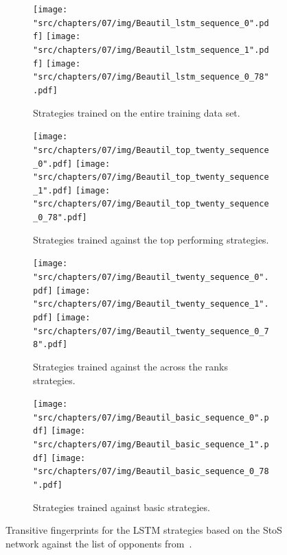 \begin{figure}[!htbp]
    \begin{subfigure}{\textwidth}
        \texttt{[image: "src/chapters/07/img/Beautil\_lstm\_sequence\_0".pdf]}
        \texttt{[image: "src/chapters/07/img/Beautil\_lstm\_sequence\_1".pdf]}
        \texttt{[image: "src/chapters/07/img/Beautil\_lstm\_sequence\_0\_78".pdf]}
        \caption{Strategies trained on the entire training data set.}
    \end{subfigure}
    \begin{subfigure}{\textwidth}
        \texttt{[image: "src/chapters/07/img/Beautil\_top\_twenty\_sequence\_0".pdf]}
        \texttt{[image: "src/chapters/07/img/Beautil\_top\_twenty\_sequence\_1".pdf]}
        \texttt{[image: "src/chapters/07/img/Beautil\_top\_twenty\_sequence\_0\_78".pdf]}
        \caption{Strategies trained against the top performing strategies.}
    \end{subfigure}
    \begin{subfigure}{\textwidth}
        \texttt{[image: "src/chapters/07/img/Beautil\_twenty\_sequence\_0".pdf]}
        \texttt{[image: "src/chapters/07/img/Beautil\_twenty\_sequence\_1".pdf]}
        \texttt{[image: "src/chapters/07/img/Beautil\_twenty\_sequence\_0\_78".pdf]}
        \caption{Strategies trained against the across the ranks strategies.}
    \end{subfigure}
    \begin{subfigure}{\textwidth}
        \texttt{[image: "src/chapters/07/img/Beautil\_basic\_sequence\_0".pdf]}
        \texttt{[image: "src/chapters/07/img/Beautil\_basic\_sequence\_1".pdf]}
        \texttt{[image: "src/chapters/07/img/Beautil\_basic\_sequence\_0\_78".pdf]}
        \caption{Strategies trained against basic strategies.}
    \end{subfigure}
    \caption{Transitive fingerprints for the LSTM strategies based on the StoS
    network against the list of opponents from~\cite{Beaufils1997}.}\label{fig:transitive_fingerprints_beautil_s_to_s}
\end{figure}


